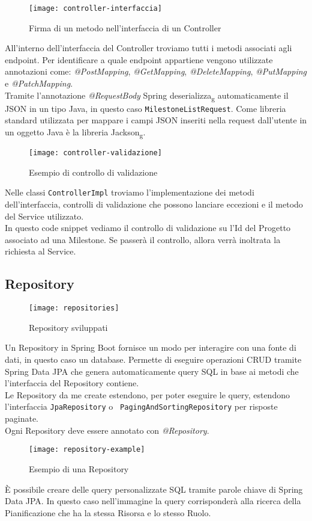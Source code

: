 \begin{figure}[H] 
    \centering 
    \texttt{[image: controller-interfaccia]} 
    \caption{Firma di un metodo nell'interfaccia di un Controller}
\end{figure}
\noindent All'interno dell'interfaccia del Controller troviamo tutti i metodi associati agli endpoint. Per identificare a quale endpoint appartiene vengono utilizzate annotazioni come: \textit{@PostMapping}, \textit{@GetMapping}, \textit{@DeleteMapping}, \textit{@PutMapping} e \textit{@PatchMapping}.\\
Tramite l'annotazione \textit{@RequestBody} Spring deserializza\textsubscript{g} automaticamente il JSON in un tipo Java, in questo caso \texttt{MilestoneListRequest}.
Come libreria standard utilizzata per mappare i campi JSON inseriti nella request dall'utente in un oggetto Java è la libreria Jackson\textsubscript{g}.

\begin{figure}[H] 
    \centering 
    \texttt{[image: controller-validazione]} 
    \caption{Esempio di controllo di validazione}
\end{figure}
\noindent Nelle classi \texttt{ControllerImpl} troviamo l'implementazione dei metodi dell'interfaccia, controlli di validazione che possono lanciare eccezioni e il metodo del Service utilizzato.\\
In questo code snippet vediamo il controllo di validazione su l'Id del Progetto associato ad una Milestone. Se passerà il controllo, allora verrà inoltrata la richiesta al Service.

\subsection{Repository}
\begin{figure}[H] 
    \centering 
    \texttt{[image: repositories]} 
    \caption{Repository sviluppati}
\end{figure}
Un Repository in Spring Boot fornisce un modo per interagire con una fonte di dati, in questo caso un database. Permette di eseguire operazioni CRUD tramite Spring Data JPA che genera automaticamente query SQL in base ai metodi che l'interfaccia del Repository contiene.\\
Le Repository da me create estendono, per poter eseguire le query, estendono l'interfaccia \texttt{JpaRepository} o \texttt{ PagingAndSortingRepository} per risposte paginate.\\
Ogni Repository deve essere annotato con \textit{@Repository}. 
\begin{figure}[H] 
    \centering 
    \texttt{[image: repository-example]} 
    \caption{Esempio di una Repository}
\end{figure}
\noindent È possibile creare delle query personalizzate SQL tramite parole chiave di Spring Data JPA. In questo caso nell'immagine la query corrisponderà alla ricerca della Pianificazione che ha la stessa Risorsa e lo stesso Ruolo.

